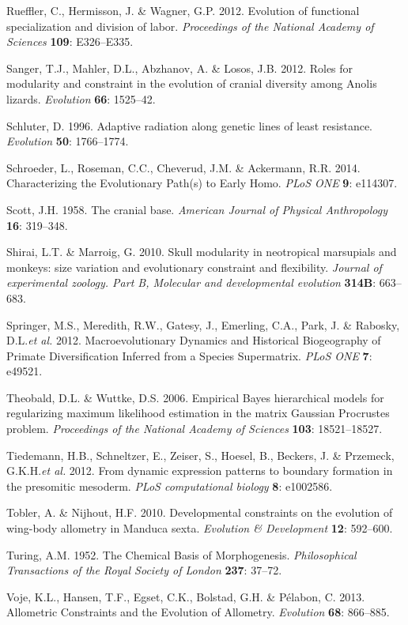 \documentclass[12pt,twoside]{report}
\begin{document}
Rueffler, C., Hermisson, J. \& Wagner, G.P. 2012. Evolution of
functional specialization and division of labor. \emph{Proceedings of
the National Academy of Sciences} \textbf{109}: E326--E335.

Sanger, T.J., Mahler, D.L., Abzhanov, A. \& Losos, J.B. 2012. Roles for
modularity and constraint in the evolution of cranial diversity among
Anolis lizards. \emph{Evolution} \textbf{66}: 1525--42.

Schluter, D. 1996. Adaptive radiation along genetic lines of least
resistance. \emph{Evolution} \textbf{50}: 1766--1774.

Schroeder, L., Roseman, C.C., Cheverud, J.M. \& Ackermann, R.R. 2014.
Characterizing the Evolutionary Path(s) to Early Homo. \emph{PLoS ONE}
\textbf{9}: e114307.

Scott, J.H. 1958. The cranial base. \emph{American Journal of Physical
Anthropology} \textbf{16}: 319--348.

Shirai, L.T. \& Marroig, G. 2010. Skull modularity in neotropical
marsupials and monkeys: size variation and evolutionary constraint and
flexibility. \emph{Journal of experimental zoology. Part B, Molecular
and developmental evolution} \textbf{314B}: 663--683.

Springer, M.S., Meredith, R.W., Gatesy, J., Emerling, C.A., Park, J. \&
Rabosky, D.L.\emph{et al.} 2012. Macroevolutionary Dynamics and
Historical Biogeography of Primate Diversification Inferred from a
Species Supermatrix. \emph{PLoS ONE} \textbf{7}: e49521.

Theobald, D.L. \& Wuttke, D.S. 2006. Empirical Bayes hierarchical models
for regularizing maximum likelihood estimation in the matrix Gaussian
Procrustes problem. \emph{Proceedings of the National Academy of
Sciences} \textbf{103}: 18521--18527.

Tiedemann, H.B., Schneltzer, E., Zeiser, S., Hoesel, B., Beckers, J. \&
Przemeck, G.K.H.\emph{et al.} 2012. From dynamic expression patterns to
boundary formation in the presomitic mesoderm. \emph{PLoS computational
biology} \textbf{8}: e1002586.

Tobler, A. \& Nijhout, H.F. 2010. Developmental constraints on the
evolution of wing-body allometry in Manduca sexta. \emph{Evolution \&
Development} \textbf{12}: 592--600.

Turing, A.M. 1952. The Chemical Basis of Morphogenesis.
\emph{Philosophical Transactions of the Royal Society of London}
\textbf{237}: 37--72.

Voje, K.L., Hansen, T.F., Egset, C.K., Bolstad, G.H. \& Pélabon, C.
2013. Allometric Constraints and the Evolution of Allometry.
\emph{Evolution} \textbf{68}: 866--885.
\end{document}
